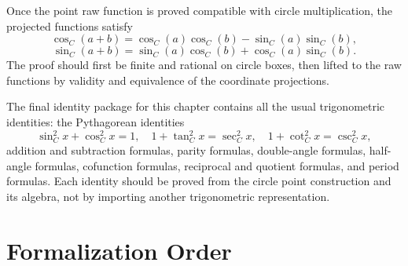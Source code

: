 \begin{theorem}
\label{thm:geometric-addition-formulas}
Once the point raw function is proved compatible with circle multiplication,
the projected functions satisfy
\[
  \cos_C(a+b)=\cos_C(a)\cos_C(b)-\sin_C(a)\sin_C(b),
\]
\[
  \sin_C(a+b)=\sin_C(a)\cos_C(b)+\cos_C(a)\sin_C(b).
\]
The proof should first be finite and rational on circle boxes, then lifted to
the raw functions by validity and equivalence of the coordinate projections.
\end{theorem}

\begin{theorem}
\label{thm:geometric-trig-identities}
The final identity package for this chapter contains all the usual
trigonometric identities: the Pythagorean identities
\[
  \sin_C^2 x+\cos_C^2 x=1,\quad
  1+\tan_C^2 x=\sec_C^2 x,\quad
  1+\cot_C^2 x=\csc_C^2 x,
\]
addition and subtraction formulas, parity formulas, double-angle formulas,
half-angle formulas, cofunction formulas, reciprocal and quotient formulas,
and period formulas.  Each identity should be proved from the circle point
construction and its algebra, not by importing another trigonometric
representation.
\end{theorem}

\section{Formalization Order}

